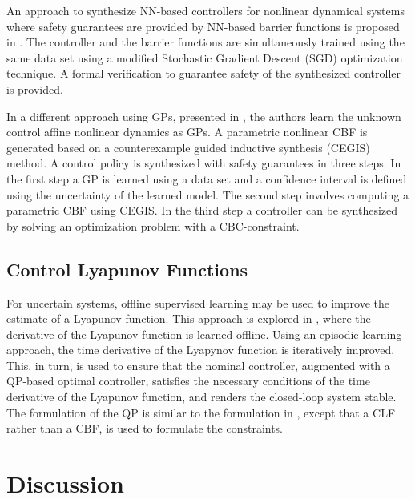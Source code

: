 \documentclass[3p,times,procedia]{elsarticle}
\begin{document}
An approach to synthesize NN-based controllers for nonlinear dynamical systems where safety guarantees are provided by NN-based barrier functions is proposed in \cite{Zhao2020}. The controller and the barrier functions are simultaneously trained using the same data set using a modified Stochastic Gradient Descent (SGD) optimization technique. A formal verification to guarantee safety of the synthesized controller is provided.

In a different approach using GPs, presented in \cite{Jagtap2020}, the authors learn the unknown control affine nonlinear dynamics as GPs. A parametric nonlinear CBF is generated based on a counterexample guided inductive synthesis (CEGIS) method. A control policy is synthesized with safety guarantees in three steps. In the first step a GP is learned using a data set and a confidence interval is defined using the uncertainty of the learned model. The second step involves computing a parametric CBF using CEGIS. In the third step a controller can be synthesized by solving an optimization problem with a CBC-constraint.

\subsection{Control Lyapunov Functions}\label{sec:offline-clf}

For uncertain systems, offline supervised learning may be used to improve the estimate of a Lyapunov function. This approach is explored in \cite{Taylor2019}, where the derivative of the Lyapunov function is learned offline. Using an episodic learning approach, the time derivative of the Lyapynov function is iteratively improved. This, in turn, is used to ensure that the nominal controller, augmented with a QP-based optimal controller, satisfies the necessary conditions of the time derivative of the Lyapunov function, and renders the closed-loop system stable. The formulation of the QP is similar to the formulation in \cite{Taylor2019a}, except that a CLF rather than a CBF, is used to formulate the constraints. 



\section{Discussion}\label{discussion}
\end{document}
